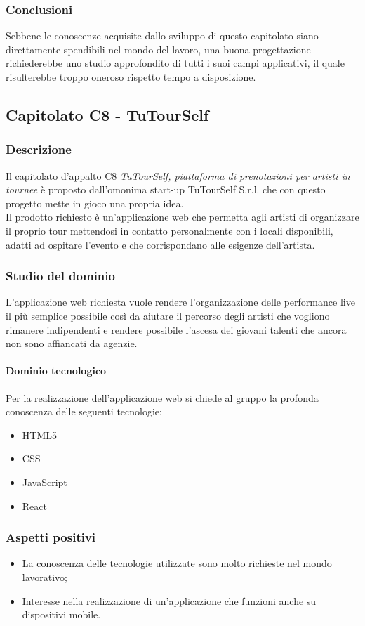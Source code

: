 		\subsubsection{Conclusioni}
		Sebbene le conoscenze acquisite dallo sviluppo di questo capitolato siano direttamente spendibili nel mondo del lavoro, una buona progettazione richiederebbe uno studio approfondito di tutti i suoi campi applicativi, il quale risulterebbe troppo oneroso rispetto tempo a disposizione.
	
	\subsection{Capitolato C8 - TuTourSelf}
		\subsubsection{Descrizione}
		Il capitolato d'appalto C8 \emph{TuTourSelf, piattaforma di prenotazioni per artisti in tournee} è proposto dall'omonima start-up TuTourSelf S.r.l. che con questo progetto mette in gioco una propria idea.\\ Il prodotto richiesto è un'applicazione web che permetta agli artisti di organizzare il proprio tour mettendosi in contatto personalmente con i locali disponibili, adatti ad ospitare l'evento e che corrispondano alle esigenze dell'artista. 
		\subsubsection{Studio del dominio} \Spazio
			L'applicazione web richiesta vuole rendere l’organizzazione delle performance live il più semplice possibile così da aiutare il percorso degli artisti che vogliono rimanere indipendenti e rendere possibile l'ascesa dei giovani talenti che ancora non sono affiancati da agenzie.
			\paragraph{Dominio tecnologico} \Spazio
			Per la realizzazione dell'applicazione web si chiede al gruppo la profonda conoscenza delle seguenti tecnologie:
			\begin{itemize}
				\item HTML5
				\item CSS
				\item JavaScript
				\item React
			\end{itemize}
		\subsubsection{Aspetti positivi}
		\begin{itemize}
			\item La conoscenza delle tecnologie utilizzate sono molto richieste nel mondo lavorativo;
			\item Interesse nella realizzazione di un'applicazione che funzioni anche su dispositivi mobile.
		\end{itemize}
